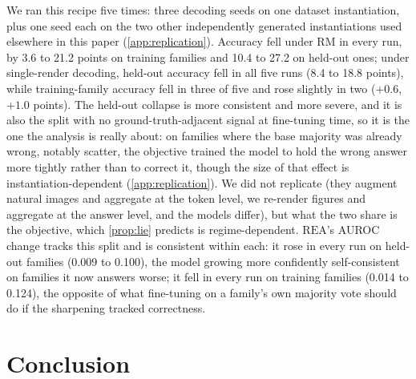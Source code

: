 \documentclass[11pt]{article}
\newcommand{\rea}{\mathrm{REA}}
\newcommand{\rmg}{\mathrm{RM}}
\begin{document}
We ran this recipe five times: three decoding seeds on one dataset instantiation, plus one seed each on the two other independently generated instantiations used elsewhere in this paper (\cref{app:replication}). Accuracy fell under $\rmg$ in every run, by 3.6 to 21.2 points on training families and 10.4 to 27.2 on held-out ones; under single-render decoding, held-out accuracy fell in all five runs (8.4 to 18.8 points), while training-family accuracy fell in three of five and rose slightly in two ($+0.6$, $+1.0$ points). The held-out collapse is more consistent and more severe, and it is also the split with no ground-truth-adjacent signal at fine-tuning time, so it is the one the analysis is really about: on families where the base majority was already wrong, notably scatter, the objective trained the model to hold the wrong answer more tightly rather than to correct it, though the size of that effect is instantiation-dependent (\cref{app:replication}). We did not replicate \citet{kaya2026efficient} (they augment natural images and aggregate at the token level, we re-render figures and aggregate at the answer level, and the models differ), but what the two share is the objective, which \cref{prop:lie} predicts is regime-dependent. $\rea$'s AUROC change tracks this split and is consistent within each: it rose in every run on held-out families (0.009 to 0.100), the model growing more confidently self-consistent on families it now answers worse; it fell in every run on training families (0.014 to 0.124), the opposite of what fine-tuning on a family's own majority vote should do if the sharpening tracked correctness.

\section{Conclusion}
\label{sec:conclusion}
\end{document}
